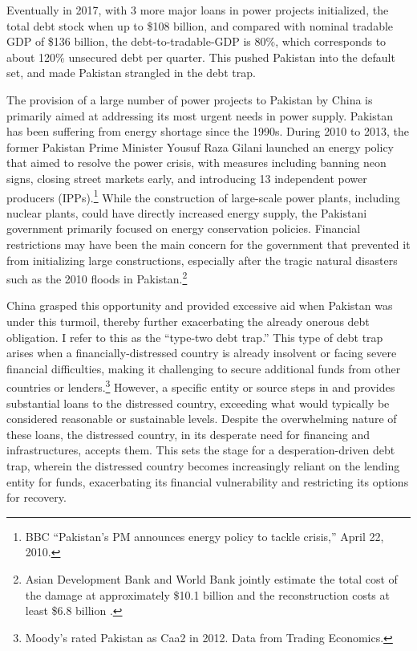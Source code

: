 Eventually in 2017, with 3 more major loans in power projects initialized, the total debt stock when up to \$108 billion, and compared with nominal tradable GDP of \$136 billion, the debt-to-tradable-GDP is 80\%, which corresponds to about 120\% unsecured debt per quarter. This pushed Pakistan into the default set, and made Pakistan strangled in the debt trap.

The provision of a large number of power projects to Pakistan by China is primarily aimed at addressing its most urgent needs in power supply. Pakistan has been suffering from energy shortage since the 1990s. During 2010 to 2013, the former Pakistan Prime Minister Yousuf Raza Gilani launched an energy policy that aimed to resolve the power crisis, with measures including banning neon signs, closing street markets early, and introducing 13 independent power producers (IPPs).\footnote{
    BBC ``Pakistan's PM announces energy policy to tackle crisis,'' April 22, 2010.
}
While the construction of large-scale power plants, including nuclear plants, could have directly increased energy supply, the Pakistani government primarily focused on energy conservation policies. Financial restrictions may have been the main concern for the government that prevented it from initializing large constructions, especially after the tragic natural disasters such as the 2010 floods in Pakistan.\footnote{
    Asian Development Bank and World Bank jointly estimate the total cost of the damage at approximately \$10.1 billion and the reconstruction costs at least \$6.8 billion \citep{pakistan-flood}.
}

China grasped this opportunity and provided excessive aid when Pakistan was under this turmoil, thereby further exacerbating the already onerous debt obligation. I refer to this as the ``type-two debt trap.''
This type of debt trap arises when a financially-distressed country is already insolvent or facing severe financial difficulties, making it challenging to secure additional funds from other countries or lenders.\footnote{
    Moody's rated Pakistan as Caa2 in 2012. Data from Trading Economics.
}
However, a specific entity or source steps in and provides substantial loans to the distressed country, exceeding what would typically be considered reasonable or sustainable levels. Despite the overwhelming nature of these loans, the distressed country, in its desperate need for financing and infrastructures, accepts them. This sets the stage for a desperation-driven debt trap, wherein the distressed country becomes increasingly reliant on the lending entity for funds, exacerbating its financial vulnerability and restricting its options for recovery.

